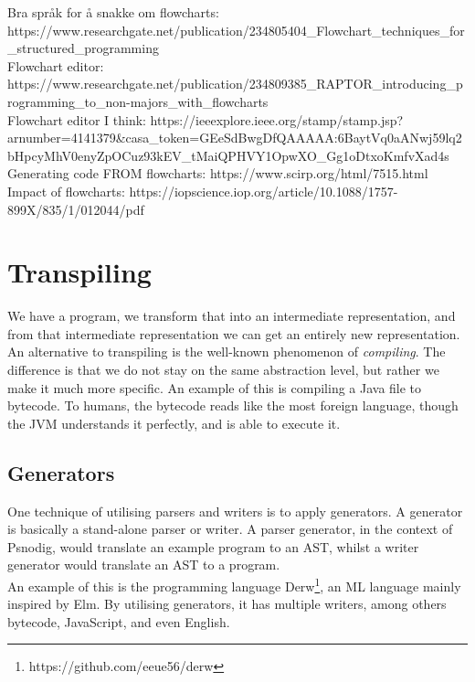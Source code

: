 Bra språk for å snakke om flowcharts: https://www.researchgate.net/publication/234805404\_Flowchart\_techniques\_for\_structured\_programming \\

Flowchart editor: https://www.researchgate.net/publication/234809385\_RAPTOR\_introducing\_programming\_to\_non-majors\_with\_flowcharts \\

Flowchart editor I think: https://ieeexplore.ieee.org/stamp/stamp.jsp?arnumber=4141379\&casa\_token=GEeSdBwgDfQAAAAA:6BaytVq0aANwj59lq2bHpcyMhV0enyZpOCuz93kEV\_tMaiQPHVY1OpwXO\_Gg1oDtxoKmfvXad4s \\

Generating code FROM flowcharts: https://www.scirp.org/html/7515.html \\

Impact of flowcharts: https://iopscience.iop.org/article/10.1088/1757-899X/835/1/012044/pdf

\section{Transpiling}
We have a program, we transform that into an intermediate representation, and from that intermediate representation we can get an entirely new representation. \hfill \\

An alternative to transpiling is the well-known phenomenon of \textit{compiling}. The difference is that we do not stay on the same abstraction level, but rather we make it much more specific. An example of this is compiling a Java file to bytecode. To humans, the bytecode reads like the most foreign language, though the JVM understands it perfectly, and is able to execute it. \hfill \\

\subsection{Generators}
One technique of utilising parsers and writers is to apply generators. A generator is basically a stand-alone parser or writer. A parser generator, in the context of Psnodig, would translate an example program to an AST, whilst a writer generator would translate an AST to a program. \hfill \\

An example of this is the programming language Derw\footnote{https://github.com/eeue56/derw}, an ML language mainly inspired by Elm. By utilising generators, it has multiple writers, among others bytecode, JavaScript, and even English. \hfill \\

